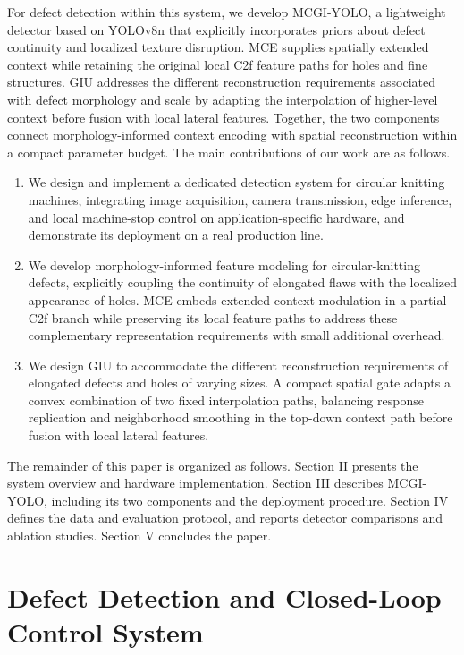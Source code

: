 \documentclass[journal]{IEEEtran}
\newcommand{\model}{MCGI-YOLO\xspace}
\begin{document}
For defect detection within this system, we develop \model, a lightweight detector based on YOLOv8n that explicitly incorporates priors about defect continuity and localized texture disruption. MCE supplies spatially extended context while retaining the original local C2f feature paths for holes and fine structures. GIU addresses the different reconstruction requirements associated with defect morphology and scale by adapting the interpolation of higher-level context before fusion with local lateral features. Together, the two components connect morphology-informed context encoding with spatial reconstruction within a compact parameter budget.
The main contributions of our work are as follows.
\begin{enumerate}
  \renewcommand{\labelenumi}{(\arabic{enumi})}
  \item We design and implement a dedicated detection system for circular knitting machines, integrating image acquisition, camera transmission, edge inference, and local machine-stop control on application-specific hardware, and demonstrate its deployment on a real production line.
  \item We develop morphology-informed feature modeling for circular-knitting defects, explicitly coupling the continuity of elongated flaws with the localized appearance of holes. MCE embeds extended-context modulation in a partial C2f branch while preserving its local feature paths to address these complementary representation requirements with small additional overhead.
  \item We design GIU to accommodate the different reconstruction requirements of elongated defects and holes of varying sizes. A compact spatial gate adapts a convex combination of two fixed interpolation paths, balancing response replication and neighborhood smoothing in the top-down context path before fusion with local lateral features.
\end{enumerate}

The remainder of this paper is organized as follows. Section II presents the system overview and hardware implementation. Section III describes MCGI-YOLO, including its two components and the deployment procedure. Section IV defines the data and evaluation protocol, and reports detector comparisons and ablation studies. Section V concludes the paper.

\section{Defect Detection and Closed-Loop Control System}
\label{sec:system-design}
\end{document}
